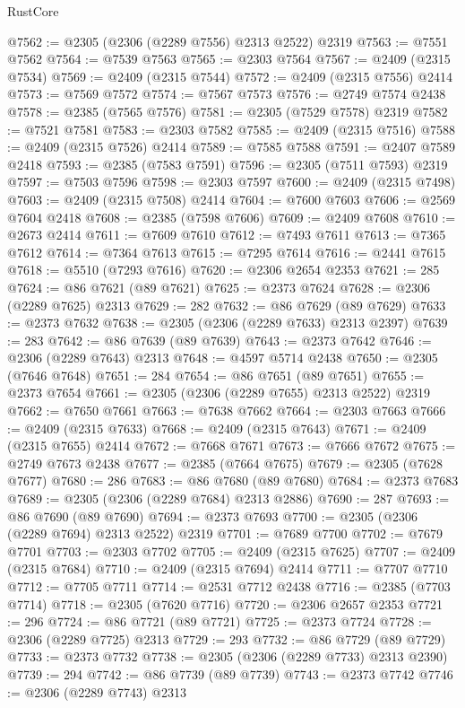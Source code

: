 \begin{lexlean}{RustCore}
\begin{coremodule}
@7562 := @2305 (@2306 (@2289 @7556) @2313 @2522) @2319
@7563 := @7551 @7562
@7564 := @7539 @7563
@7565 := @2303 @7564
@7567 := @2409 (@2315 @7534)
@7569 := @2409 (@2315 @7544)
@7572 := @2409 (@2315 @7556) @2414
@7573 := @7569 @7572
@7574 := @7567 @7573
@7576 := @2749 @7574 @2438
@7578 := @2385 (@7565 @7576)
@7581 := @2305 (@7529 @7578) @2319
@7582 := @7521 @7581
@7583 := @2303 @7582
@7585 := @2409 (@2315 @7516)
@7588 := @2409 (@2315 @7526) @2414
@7589 := @7585 @7588
@7591 := @2407 @7589 @2418
@7593 := @2385 (@7583 @7591)
@7596 := @2305 (@7511 @7593) @2319
@7597 := @7503 @7596
@7598 := @2303 @7597
@7600 := @2409 (@2315 @7498)
@7603 := @2409 (@2315 @7508) @2414
@7604 := @7600 @7603
@7606 := @2569 @7604 @2418
@7608 := @2385 (@7598 @7606)
@7609 := @2409 @7608
@7610 := @2673 @2414
@7611 := @7609 @7610
@7612 := @7493 @7611
@7613 := @7365 @7612
@7614 := @7364 @7613
@7615 := @7295 @7614
@7616 := @2441 @7615
@7618 := @5510 (@7293 @7616)
@7620 := @2306 @2654 @2353
@7621 := 285
@7624 := @86 @7621 (@89 @7621)
@7625 := @2373 @7624
@7628 := @2306 (@2289 @7625) @2313
@7629 := 282
@7632 := @86 @7629 (@89 @7629)
@7633 := @2373 @7632
@7638 := @2305 (@2306 (@2289 @7633) @2313 @2397)
@7639 := 283
@7642 := @86 @7639 (@89 @7639)
@7643 := @2373 @7642
@7646 := @2306 (@2289 @7643) @2313
@7648 := @4597 @5714 @2438
@7650 := @2305 (@7646 @7648)
@7651 := 284
@7654 := @86 @7651 (@89 @7651)
@7655 := @2373 @7654
@7661 := @2305 (@2306 (@2289 @7655) @2313 @2522) @2319
@7662 := @7650 @7661
@7663 := @7638 @7662
@7664 := @2303 @7663
@7666 := @2409 (@2315 @7633)
@7668 := @2409 (@2315 @7643)
@7671 := @2409 (@2315 @7655) @2414
@7672 := @7668 @7671
@7673 := @7666 @7672
@7675 := @2749 @7673 @2438
@7677 := @2385 (@7664 @7675)
@7679 := @2305 (@7628 @7677)
@7680 := 286
@7683 := @86 @7680 (@89 @7680)
@7684 := @2373 @7683
@7689 := @2305 (@2306 (@2289 @7684) @2313 @2886)
@7690 := 287
@7693 := @86 @7690 (@89 @7690)
@7694 := @2373 @7693
@7700 := @2305 (@2306 (@2289 @7694) @2313 @2522) @2319
@7701 := @7689 @7700
@7702 := @7679 @7701
@7703 := @2303 @7702
@7705 := @2409 (@2315 @7625)
@7707 := @2409 (@2315 @7684)
@7710 := @2409 (@2315 @7694) @2414
@7711 := @7707 @7710
@7712 := @7705 @7711
@7714 := @2531 @7712 @2438
@7716 := @2385 (@7703 @7714)
@7718 := @2305 (@7620 @7716)
@7720 := @2306 @2657 @2353
@7721 := 296
@7724 := @86 @7721 (@89 @7721)
@7725 := @2373 @7724
@7728 := @2306 (@2289 @7725) @2313
@7729 := 293
@7732 := @86 @7729 (@89 @7729)
@7733 := @2373 @7732
@7738 := @2305 (@2306 (@2289 @7733) @2313 @2390)
@7739 := 294
@7742 := @86 @7739 (@89 @7739)
@7743 := @2373 @7742
@7746 := @2306 (@2289 @7743) @2313

\end{coremodule}
\end{lexlean}
